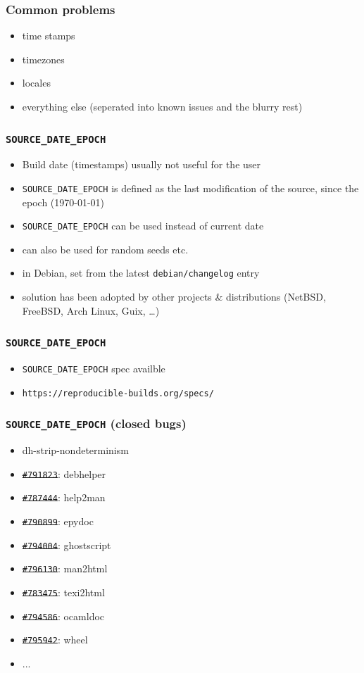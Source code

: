 \documentclass[14pt]{beamer}
\begin{document}
\begin{frame}
 \frametitle{Common problems}

 \begin{itemize}
  \item time stamps
  \item<2-3> timezones
  \item<2-3> locales
  \item<3> everything else (seperated into known issues and the blurry rest)
 \end{itemize}
\end{frame}


\begin{frame}
 \frametitle{\texttt{SOURCE\_DATE\_EPOCH}}

 \begin{itemize}
  \item Build date (timestamps) usually not useful for the user
  \item<2-3> \texttt{SOURCE\_DATE\_EPOCH} is defined as the last modification of
  the source, since the epoch (1970-01-01)
  \item<2-3> \texttt{SOURCE\_DATE\_EPOCH} can be used instead of current date
  \item<2-3> can also be used for random seeds etc.
  \item<3> in Debian, set from the latest \texttt{debian/changelog} entry
  \item<3> solution has been adopted by other projects \& distributions
  (NetBSD, FreeBSD, Arch Linux, Guix, …)
 \end{itemize}
\end{frame}

\begin{frame}
 \frametitle{\texttt{SOURCE\_DATE\_EPOCH}}

 \begin{itemize}
  \item \texttt{SOURCE\_DATE\_EPOCH} spec availble
  \item \texttt{https://reproducible-builds.org/specs/}
 \end{itemize}
\end{frame}


\begin{frame}
 \frametitle{\texttt{SOURCE\_DATE\_EPOCH} (closed bugs)}

 \begin{itemize}
  \item dh-strip-nondeterminism
  \item \sout{\texttt{\#791823}}: debhelper
  \item \sout{\texttt{\#787444}}: help2man
  \item \sout{\texttt{\#790899}}: epydoc
  \item \sout{\texttt{\#794004}}: ghostscript
  \item \sout{\texttt{\#796130}}: man2html
  \item \sout{\texttt{\#783475}}: texi2html
  \item \sout{\texttt{\#794586}}: ocamldoc
  \item \sout{\texttt{\#795942}}: wheel
  \item ...
 \end{itemize}
\end{frame}
\end{document}
